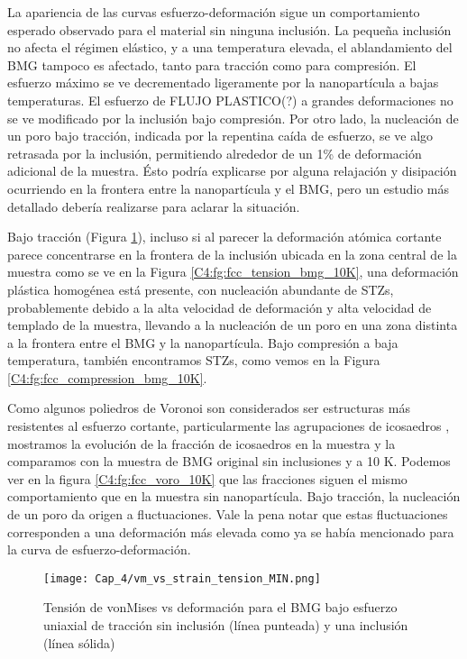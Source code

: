 La apariencia de las curvas esfuerzo-deformación sigue un comportamiento esperado observado para el material sin ninguna inclusión. La pequeña inclusión no afecta el régimen elástico, y a una temperatura elevada, el ablandamiento del BMG tampoco es afectado, tanto para tracción como para compresión. El esfuerzo máximo se ve decrementado ligeramente por la nanopartícula a bajas temperaturas. El esfuerzo de FLUJO PLASTICO(?) a grandes deformaciones no se ve modificado por la inclusión bajo compresión. Por otro lado, la nucleación de un poro bajo tracción, indicada por la repentina caída de esfuerzo, se ve algo retrasada por la inclusión, permitiendo alrededor de un 1\% de deformación adicional de la muestra. Ésto podría explicarse por alguna relajación y disipación ocurriendo en la frontera entre la nanopartícula y el BMG, pero un estudio más detallado debería realizarse para aclarar la situación.

Bajo tracción (Figura \ref{C4:fg:fcc_vm_tension}), incluso si al parecer la deformación atómica cortante parece concentrarse en la frontera de la inclusión ubicada en la zona central de la muestra como se ve en la Figura \ref{C4:fg:fcc_tension_bmg_10K}, una deformación plástica homogénea está presente, con nucleación abundante de STZs, probablemente debido a la alta velocidad de deformación y alta velocidad de templado de la muestra, llevando a la nucleación de un poro en una zona distinta a la frontera entre el BMG y la nanopartícula. Bajo compresión a baja temperatura, también encontramos STZs, como vemos en la Figura \ref{C4:fg:fcc_compression_bmg_10K}.

Como algunos poliedros de Voronoi son considerados ser estructuras más resistentes al esfuerzo cortante, particularmente las agrupaciones de icosaedros \cite{cheng08}, mostramos la evolución de la fracción de icosaedros en la muestra y la comparamos con la muestra de BMG original sin inclusiones y a 10 K. Podemos ver en la figura \ref{C4:fg:fcc_voro_10K} que las fracciones siguen el mismo comportamiento que en la muestra sin nanopartícula. Bajo tracción, la nucleación de un poro da origen a fluctuaciones. Vale la pena notar que estas fluctuaciones corresponden a una deformación más elevada como ya se había mencionado para la curva de esfuerzo-deformación.

\begin{figure}[h!]
\centering
\texttt{[image: Cap\_4/vm\_vs\_strain\_tension\_MIN.png]}
\caption[vonMises vs deformación (tracción)]{Tensión de vonMises vs deformación para el BMG bajo esfuerzo uniaxial de tracción sin inclusión (línea punteada) y una inclusión (línea sólida)}
\label{C4:fg:fcc_vm_tension}
\end{figure}

